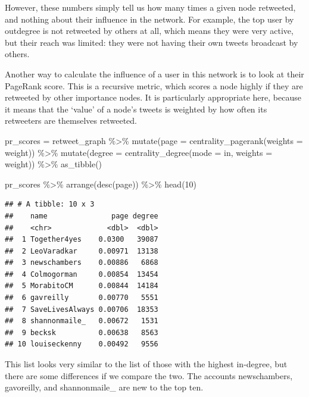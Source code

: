 \documentclass[
]{book}
\newenvironment{Shaded}{\begin{snugshade}}{\end{snugshade}}
\newcommand{\AttributeTok}[1]{\textcolor[rgb]{0.77,0.63,0.00}{#1}}
\newcommand{\DecValTok}[1]{\textcolor[rgb]{0.00,0.00,0.81}{#1}}
\newcommand{\FunctionTok}[1]{\textcolor[rgb]{0.00,0.00,0.00}{#1}}
\newcommand{\NormalTok}[1]{#1}
\newcommand{\OtherTok}[1]{\textcolor[rgb]{0.56,0.35,0.01}{#1}}
\newcommand{\SpecialCharTok}[1]{\textcolor[rgb]{0.00,0.00,0.00}{#1}}
\newcommand{\StringTok}[1]{\textcolor[rgb]{0.31,0.60,0.02}{#1}}
\begin{document}
However, these numbers simply tell us how many times a given node retweeted, and nothing about their influence in the network. For example, the top user by outdegree is not retweeted by others at all, which means they were very active, but their reach was limited: they were not having their own tweets broadcast by others.

Another way to calculate the influence of a user in this network is to look at their PageRank score. This is a recursive metric, which scores a node highly if they are retweeted by other importance nodes. It is particularly appropriate here, because it means that the `value' of a node's tweets is weighted by how often its retweeters are themselves retweeted.

\begin{Shaded}
\begin{Highlighting}[]
\NormalTok{pr\_scores }\OtherTok{=}\NormalTok{ retweet\_graph }\SpecialCharTok{\%\textgreater{}\%}  
  \FunctionTok{mutate}\NormalTok{(}\AttributeTok{page =} \FunctionTok{centrality\_pagerank}\NormalTok{(}\AttributeTok{weights =}\NormalTok{ weight)) }\SpecialCharTok{\%\textgreater{}\%}
  \FunctionTok{mutate}\NormalTok{(}\AttributeTok{degree =} \FunctionTok{centrality\_degree}\NormalTok{(}\AttributeTok{mode =} \StringTok{\textquotesingle{}in\textquotesingle{}}\NormalTok{, }\AttributeTok{weights =}\NormalTok{ weight)) }\SpecialCharTok{\%\textgreater{}\%} 
  \FunctionTok{as\_tibble}\NormalTok{()}

\NormalTok{pr\_scores }\SpecialCharTok{\%\textgreater{}\%} \FunctionTok{arrange}\NormalTok{(}\FunctionTok{desc}\NormalTok{(page)) }\SpecialCharTok{\%\textgreater{}\%} \FunctionTok{head}\NormalTok{(}\DecValTok{10}\NormalTok{)}
\end{Highlighting}
\end{Shaded}

\begin{verbatim}
## # A tibble: 10 x 3
##    name               page degree
##    <chr>             <dbl>  <dbl>
##  1 Together4yes    0.0300   39087
##  2 LeoVaradkar     0.00971  13138
##  3 newschambers    0.00886   6868
##  4 Colmogorman     0.00854  13454
##  5 MorabitoCM      0.00844  14184
##  6 gavreilly       0.00770   5551
##  7 SaveLivesAlways 0.00706  18353
##  8 shannonmaile_   0.00672   1531
##  9 becksk          0.00638   8563
## 10 louiseckenny    0.00492   9556
\end{verbatim}

This list looks very similar to the list of those with the highest in-degree, but there are some differences if we compare the two. The accounts newschambers, gavoreilly, and shannonmaile\_ are new to the top ten.
\end{document}
